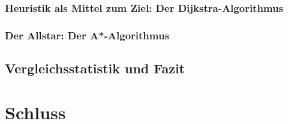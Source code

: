 \documentclass[12pt]{article}
\begin{document}
\subsubsection{Heuristik als Mittel zum Ziel: Der Dijkstra-Algorithmus}
\newpage

\subsubsection{Der Allstar: Der A*-Algorithmus}
\newpage

\subsection{Vergleichsstatistik und Fazit}
\newpage

\section{Schluss}
\end{document}
